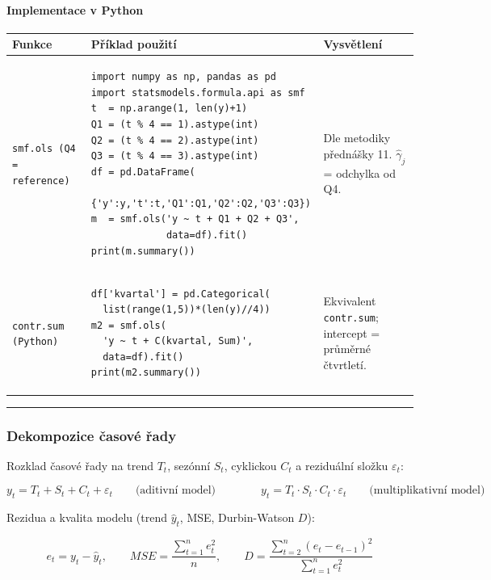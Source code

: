\documentclass[a4paper, 11pt]{article}
\newenvironment{funkcedict}
{%
  \begingroup
  \renewcommand{\arraystretch}{1.4}%
  \lstset{basicstyle=\ttfamily\small, columns=fullflexible}%
  \setlength{\tabcolsep}{4pt}%
  \begin{tabular}{p{0.19\textwidth} p{0.38\textwidth} p{0.30\textwidth}}
  \textbf{Funkce} & \textbf{Příklad použití} & \textbf{Vysvětlení} \\
  \midrule
}
{%
  \end{tabular}%
  \endgroup
}
\begin{document}
\paragraph{Implementace v Python}\mbox{}\par

\begin{funkcedict}

	\texttt{smf.ols (Q4 = reference)} &
	\begin{lstlisting}
import numpy as np, pandas as pd
import statsmodels.formula.api as smf
t  = np.arange(1, len(y)+1)
Q1 = (t % 4 == 1).astype(int)
Q2 = (t % 4 == 2).astype(int)
Q3 = (t % 4 == 3).astype(int)
df = pd.DataFrame(
  {'y':y,'t':t,'Q1':Q1,'Q2':Q2,'Q3':Q3})
m  = smf.ols('y ~ t + Q1 + Q2 + Q3',
             data=df).fit()
print(m.summary())
	\end{lstlisting}
	& Dle metodiky přednášky 11. $\hat\gamma_j$ = odchylka od Q4. \\

	\texttt{contr.sum (Python)} &
	\begin{lstlisting}
df['kvartal'] = pd.Categorical(
  list(range(1,5))*(len(y)//4))
m2 = smf.ols(
  'y ~ t + C(kvartal, Sum)',
  data=df).fit()
print(m2.summary())
	\end{lstlisting}
	& Ekvivalent \texttt{contr.sum}; intercept = průměrné čtvrtletí. \\

\end{funkcedict}

\noindent\hrule\medskip

\subsubsection{Dekompozice časové řady}

Rozklad časové řady na trend $T_t$, sezónní $S_t$, cyklickou $C_t$ a reziduální složku $\varepsilon_t$:

\begin{equation*}
	y_t = T_t + S_t + C_t + \varepsilon_t \qquad \text{(aditivní model)}
	\qquad\qquad
	y_t = T_t \cdot S_t \cdot C_t \cdot \varepsilon_t \qquad \text{(multiplikativní model)}
\end{equation*}

Rezidua a kvalita modelu (trend $\hat{y}_t$, MSE, Durbin-Watson $D$):

\begin{equation*}
	e_t = y_t - \hat{y}_t, \qquad
	MSE = \frac{\displaystyle\sum_{t=1}^{n} e_t^2}{n}, \qquad
	D = \frac{\displaystyle\sum_{t=2}^{n}(e_t - e_{t-1})^2}{\displaystyle\sum_{t=1}^{n} e_t^2}
\end{equation*}
\end{document}
